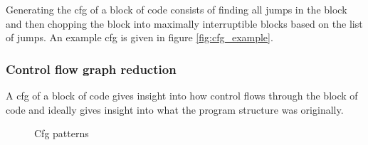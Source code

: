 \documentclass[leqno,11pt]{article}
\begin{document}
Generating the cfg of a block of code consists of finding all jumps in the block and then chopping the block into maximally interruptible blocks based on the list of jumps. An example cfg is given in figure \ref{fig:cfg_example}.

\subsubsection{Control flow graph reduction}

A cfg of a block of code gives insight into how control flows through the block of code and ideally gives insight into what the program structure was originally. 

\begin{figure}[h!]
  \centering
  \hspace{1cm}             
  \hspace{1cm}             
  \hspace{1cm}             
  \caption{Cfg patterns}
  \label{fig:cfg_patterns}
\end{figure}
\end{document}
